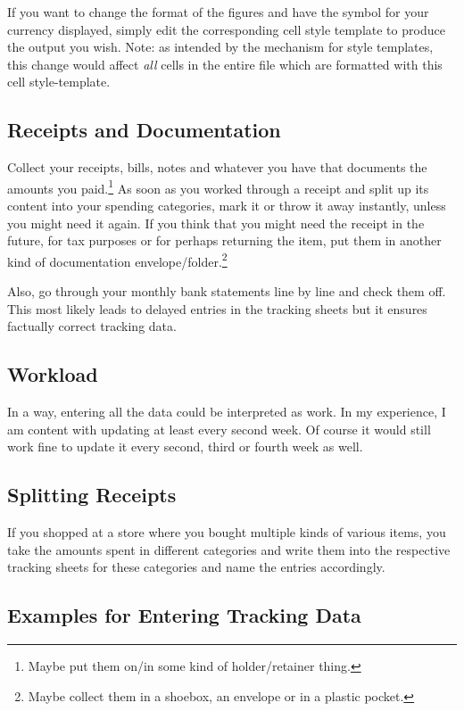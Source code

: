 If you want to change the format of the figures and have the symbol for your currency displayed, simply edit the corresponding cell style template to produce the output you wish.
Note: as intended by the mechanism for style templates, this change would affect \emph{all} cells in the entire file which are formatted with this cell style-template.

\subsection{Receipts and Documentation}
\label{subsec:tracking-receipts}

Collect your receipts, bills, notes and whatever you have that documents the amounts you paid.\footnote{Maybe put them on/in some kind of holder/retainer thing.}
As soon as you worked through a receipt and split up its content into your spending categories, mark it or throw it away instantly, unless you might need it again.
If you think that you might need the receipt in the future, \eg for tax purposes or for perhaps returning the item, put them in another kind of documentation envelope/folder.\footnote{Maybe collect them in a shoebox, an envelope or in a plastic pocket.}

Also, go through your monthly bank statements line by line and check them off.
This most likely leads to delayed entries in the tracking sheets but it ensures factually correct tracking data.

\subsection{Workload}
\label{subsec:tracking-workload}

In a way, entering all the data could be interpreted as work.
In my experience, I am content with updating \tfn at least every second week.
Of course it would still work fine to update it every second, third or fourth week as well.

\subsection{Splitting Receipts}
\label{subsec:splitting-receipts}

If you shopped at a store where you bought multiple kinds of various items, you take the amounts spent in different categories and write them into the respective tracking sheets for these categories and name the entries accordingly.

\subsection{Examples for Entering Tracking Data}
\label{subsec:examples-for-entering-tracking-data}

